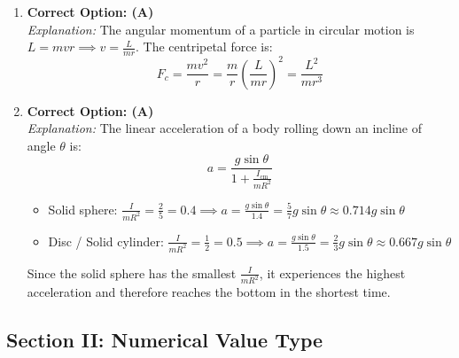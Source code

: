 \documentclass[11pt,a4paper]{article}
\begin{document}
\begin{enumerate}[label=\textbf{Q\arabic*.},leftmargin=24pt,itemsep=10pt]
  \item \textbf{Correct Option: (A)}\\
  \textit{Explanation:} The angular momentum of a particle in circular motion is $L = m v r \implies v = \frac{L}{m r}$. The centripetal force is:
  \[
    F_c = \frac{m v^2}{r} = \frac{m}{r} \left( \frac{L}{m r} \right)^2 = \frac{L^2}{m r^3}
  \]

  \item \textbf{Correct Option: (A)}\\
  \textit{Explanation:} The linear acceleration of a body rolling down an incline of angle $\theta$ is:
  \[
    a = \frac{g \sin\theta}{1 + \frac{I_{\text{cm}}}{m R^2}}
  \]
  \begin{itemize}
    \item Solid sphere: $\frac{I}{m R^2} = \frac{2}{5} = 0.4 \implies a = \frac{g \sin\theta}{1.4} = \frac{5}{7} g \sin\theta \approx 0.714 g \sin\theta$
    \item Disc / Solid cylinder: $\frac{I}{m R^2} = \frac{1}{2} = 0.5 \implies a = \frac{g \sin\theta}{1.5} = \frac{2}{3} g \sin\theta \approx 0.667 g \sin\theta$
  \end{itemize}
  Since the solid sphere has the smallest $\frac{I}{m R^2}$, it experiences the highest acceleration and therefore reaches the bottom in the shortest time.

\end{enumerate}

\subsection*{Section II: Numerical Value Type}
\end{document}
